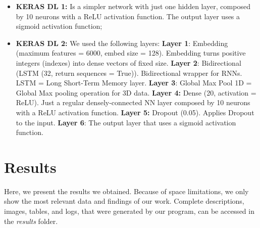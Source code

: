 \documentclass[conference]{IEEEtran}
\begin{document}
\begin{itemize}
    \item \textbf{KERAS DL 1:} Is a simpler network with just one hidden layer, composed by 10 neurons with a ReLU activation function. The output layer uses a sigmoid activation function;
    \item \textbf{KERAS DL 2:} We used the following layers: \textbf{Layer 1}: Embedding (maximum features = 6000, embed size = 128). Embedding turns positive integers (indexes) into dense vectors of fixed size. \textbf{Layer 2}: Bidirectional (LSTM (32, return sequences = True)). Bidirectional wrapper for RNNs. LSTM = Long Short-Term Memory layer. \textbf{Layer 3}: Global Max Pool 1D = Global Max pooling operation for 3D data. \textbf{Layer 4:} Dense (20, activation = ReLU). Just a regular densely-connected NN layer composed by 10 neurons with a ReLU activation function. \textbf{Layer 5:} Dropout (0.05). Applies Dropout to the input. \textbf{Layer 6}: The output layer that uses a sigmoid activation function.
\end{itemize}


\section{Results}
\label{section:results}

Here, we present the results we obtained. Because of space limitations, we only show the most relevant data and findings of our work. Complete descriptions, images, tables, and logs, that were generated by our program, can be accessed in the \textit{results} folder.

\medskip
\end{document}
